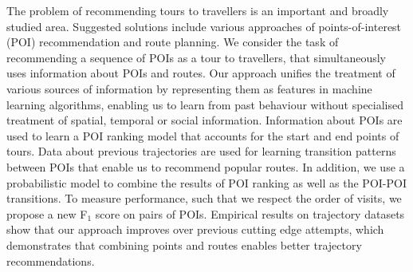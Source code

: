 The problem of recommending tours to travellers is an important and broadly studied area.
Suggested solutions include various approaches of points-of-interest (POI) 
recommendation and route planning.
We consider the task of recommending a sequence of POIs as a tour
to travellers, that simultaneously uses information about POIs and routes.
Our approach unifies the treatment of various sources of information
by representing them as features in machine learning algorithms, enabling us to
learn from past behaviour without specialised treatment of spatial, temporal or social information.
Information about POIs are used to learn a POI ranking model
that accounts for the start and end points of tours.
Data about previous trajectories are used for learning transition patterns between POIs that
enable us to recommend popular routes.
In addition, we use a probabilistic model 
to combine the results of POI ranking as well as the POI-POI transitions.
To measure performance, such that we respect the order of visits, we propose
a new F$_1$ score on pairs of POIs.
Empirical results on trajectory datasets show that our approach improves over 
previous cutting edge attempts, which demonstrates that
combining points and routes enables better trajectory recommendations.
